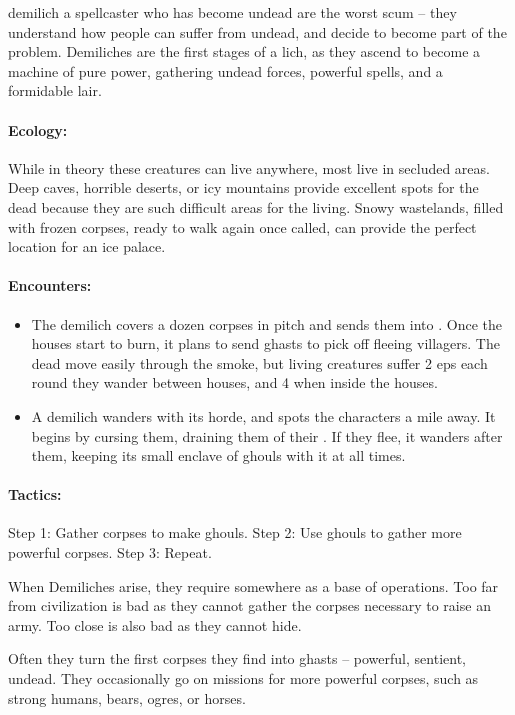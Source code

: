 \begin{multicols}{2}
  {demilich}%
  {a spellcaster who has become undead}%
are the worst scum -- they understand how people can suffer from undead, and decide to become part of the problem.
Demiliches are the first stages of a lich, as they ascend to become a machine of pure power, gathering undead forces, powerful spells, and a formidable lair.

\paragraph{Ecology:} While in theory these creatures can live anywhere, most live in secluded areas.
Deep caves, horrible deserts, or icy mountains provide excellent spots for the dead because they are such difficult areas for the living.
Snowy wastelands, filled with frozen corpses, ready to walk again once called, can provide the perfect location for an ice palace.

\paragraph{Encounters:}

\begin{itemize}
  \item
  The demilich covers a dozen corpses in pitch and sends them into .
  Once the houses start to burn, it plans to send ghasts to pick off fleeing villagers.
  The dead move easily through the smoke, but living creatures suffer 2 \glspl{ep} each round they wander between houses, and 4 when inside the houses.
  \item
  A demilich wanders with its horde, and spots the characters a mile away.
  It begins by cursing them, draining them of their .
  If they flee, it wanders after them, keeping its small enclave of ghouls with it at all times.

\end{itemize}

\paragraph{Tactics:}
Step 1: Gather corpses to make ghouls.
Step 2: Use ghouls to gather more powerful corpses.
Step 3: Repeat.

When Demiliches arise, they require somewhere as a base of operations.
Too far from civilization is bad as they cannot gather the corpses necessary to raise an army.
Too close is also bad as they cannot hide.

Often they turn the first corpses they find into ghasts -- powerful, sentient, undead.
They occasionally go on missions for more powerful corpses, such as strong humans, bears, ogres, or horses.

\demilich

\end{multicols}

